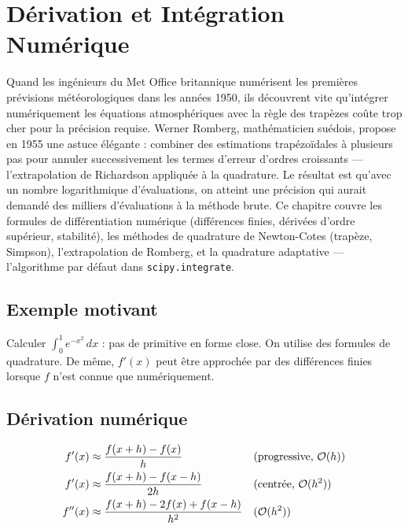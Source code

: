 \chapter{D\'erivation et Int\'egration Num\'erique}
\label{ch:integration}

Quand les ingénieurs du Met Office britannique numérisent les premières prévisions météorologiques dans les années 1950, ils découvrent vite qu'intégrer numériquement les équations atmosphériques avec la règle des trapèzes coûte trop cher pour la précision requise. Werner Romberg, mathématicien suédois, propose en 1955 une astuce élégante : combiner des estimations trapézoïdales à plusieurs pas pour annuler successivement les termes d'erreur d'ordres croissants --- l'extrapolation de Richardson appliquée à la quadrature. Le résultat est qu'avec un nombre logarithmique d'évaluations, on atteint une précision qui aurait demandé des milliers d'évaluations à la méthode brute. Ce chapitre couvre les formules de différentiation numérique (différences finies, dérivées d'ordre supérieur, stabilité), les méthodes de quadrature de Newton-Cotes (trapèze, Simpson), l'extrapolation de Romberg, et la quadrature adaptative --- l'algorithme par défaut dans \texttt{scipy.integrate}.

\section{Exemple motivant}
Calculer $\int_0^1 e^{-x^2}\,dx$ : pas de primitive en forme close. On utilise des formules de quadrature. De m\^eme, $f'(x)$ peut \^etre approch\'ee par des diff\'erences finies lorsque $f$ n'est connue que num\'eriquement.

\section{D\'erivation num\'erique}

\begin{definition}
\begin{align}
f'(x) &\approx \frac{f(x+h)-f(x)}{h} && \text{(progressive, } \mathcal{O}(h)\text{)} \\
f'(x) &\approx \frac{f(x+h)-f(x-h)}{2h} && \text{(centr\'ee, } \mathcal{O}(h^2)\text{)} \\
f''(x) &\approx \frac{f(x+h)-2f(x)+f(x-h)}{h^2} && (\mathcal{O}(h^2))
\end{align}
\end{definition}

